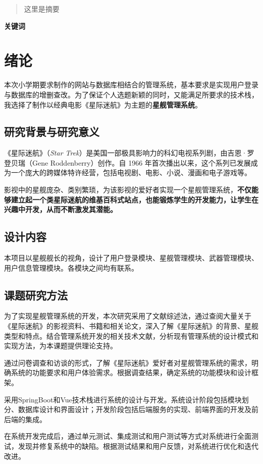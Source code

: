 \documentclass{base}
\begin{document}
\cover
\newpage
\tableofcontents

\newpage
\begin{abstract}
	这里是摘要
\end{abstract}
\textbf{关键词}
\newpage

\section{绪论}
本次小学期要求制作的网站与数据库相结合的管理系统，基本要求是实现用户登录与数据库的增删查改。为了保证个人选题新颖的同时，又能满足所要求的技术栈，我选择了制作以经典电影《星际迷航》为主题的\textbf{星舰管理系统}。
\subsection{研究背景与研究意义}
《星际迷航》（\textit{Star Trek}）是美国一部极具影响力的科幻电视系列剧，由吉恩·罗登贝瑞（Gene Roddenberry）创作。自 1966 年首次播出以来，这个系列已发展成为一个庞大的跨媒体特许经营，包括电视剧、电影、小说、漫画和电子游戏等。

影视中的星舰庞杂、类别繁琐，为该影视的爱好者实现一个星舰管理系统，\textbf{不仅能够建立起一个类星际迷航的维基百科式站点，也能锻炼学生的开发能力，让学生在兴趣中开发，从而不断激发其潜能。}
\subsection{设计内容}
本项目以星舰舰长的视角，设计了用户登录模块、星舰管理模块、武器管理模块、用户信息管理模块。各模块之间均有联系。
\subsection{课题研究方法}

为了实现星舰管理系统的开发，本次研究采用了文献综述法，通过查阅大量关于《星际迷航》的影视资料、书籍和相关论文，深入了解《星际迷航》的背景、星舰类型和特点。结合管理系统开发的相关技术文献，分析现有管理系统的设计模式和实现方法，为本课题提供理论支持。

通过问卷调查和访谈的形式，了解《星际迷航》爱好者对星舰管理系统的需求，明确系统的功能要求和用户体验需求。根据调查结果，确定系统的功能模块和设计框架。

采用SpringBoot和Vue技术栈进行系统的设计与开发。系统设计阶段包括模块划分、数据库设计和界面设计；开发阶段包括后端服务的实现、前端界面的开发及前后端的集成。

在系统开发完成后，通过单元测试、集成测试和用户测试等方式对系统进行全面测试，发现并修复系统中的缺陷。根据测试结果和用户反馈，对系统进行优化和迭代改进。
\end{document}
